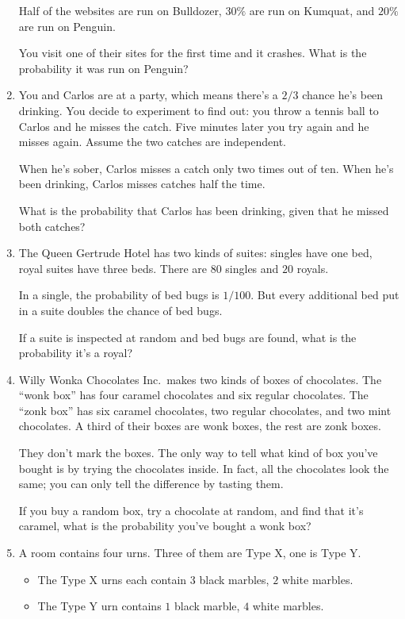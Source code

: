 \documentclass[justified]{tufte-book}
\providecommand{\tightlist}{%
  \setlength{\itemsep}{0pt}\setlength{\parskip}{0pt}}
\theoremstyle{definition}
\theoremstyle{definition}
\theoremstyle{definition}
\theoremstyle{definition}
\theoremstyle{remark}
\begin{document}
\begin{enumerate}
  Half of the websites are run on Bulldozer, \(30\%\) are run on Kumquat, and \(20\%\) are run on Penguin.

  You visit one of their sites for the first time and it crashes. What is the probability it was run on Penguin?
\item
  You and Carlos are at a party, which means there's a \(2/3\) chance he's been drinking. You decide to experiment to find out: you throw a tennis ball to Carlos and he misses the catch. Five minutes later you try again and he misses again. Assume the two catches are independent.

  When he's sober, Carlos misses a catch only two times out of ten. When he's been drinking, Carlos misses catches half the time.

  What is the probability that Carlos has been drinking, given that he missed both catches?
\item
  The Queen Gertrude Hotel has two kinds of suites: singles have one bed, royal suites have three beds. There are \(80\) singles and \(20\) royals.

  In a single, the probability of bed bugs is \(1/100\). But every additional bed put in a suite doubles the chance of bed bugs.

  If a suite is inspected at random and bed bugs are found, what is the probability it's a royal?
\item
  Willy Wonka Chocolates Inc.~makes two kinds of boxes of chocolates. The ``wonk box'' has four caramel chocolates and six regular chocolates. The ``zonk box'' has six caramel chocolates, two regular chocolates, and two mint chocolates. A third of their boxes are wonk boxes, the rest are zonk boxes.

  They don't mark the boxes. The only way to tell what kind of box you've bought is by trying the chocolates inside. In fact, all the chocolates look the same; you can only tell the difference by tasting them.

  If you buy a random box, try a chocolate at random, and find that it's caramel, what is the probability you've bought a wonk box?
\item
  A room contains four urns. Three of them are Type X, one is Type Y.

  \begin{itemize}
  \tightlist
  \item
    The Type X urns each contain \(3\) black marbles, \(2\) white marbles.
  \item
    The Type Y urn contains \(1\) black marble, \(4\) white marbles.
  \end{itemize}


\end{enumerate}
\end{document}
